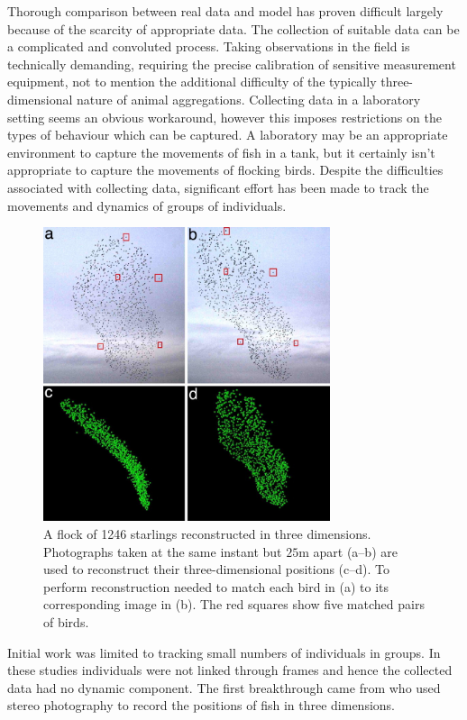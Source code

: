 Thorough comparison between real data and model has proven difficult largely
because of the scarcity of appropriate data. The collection of suitable data
can be a complicated and convoluted process. Taking observations in the field
is technically demanding, requiring the precise calibration of sensitive
measurement equipment, not to mention the additional difficulty of the
typically three-dimensional nature of animal aggregations. Collecting data in a
laboratory setting seems an obvious workaround, however this imposes
restrictions on the types of behaviour which can be captured. A laboratory may
be an appropriate environment to capture the movements of fish in a tank, but
it certainly isn't appropriate to capture the movements of flocking birds.
Despite the difficulties associated with collecting data, significant effort
has been made to track the movements and dynamics of groups of individuals.

\begin{figure}[tb]
	\includegraphics[width=0.75\textwidth]{ballerini_starlings.jpg}
    \caption{A flock of 1246 starlings reconstructed in three dimensions.
      Photographs taken at the same instant but $25$m apart (a--b) are used
      to reconstruct their three-dimensional positions (c--d). To perform
      reconstruction \textcite{ballerini08} needed to match each bird in (a)
      to its corresponding image in (b). The red squares show five matched
      pairs of birds.}
	\label{fig:ballerini}
\end{figure}

Initial work was limited to tracking small numbers of individuals in groups. In
these studies individuals were not linked through frames and hence the
collected data had no dynamic component. The first breakthrough came from
\textcite{cullen65} who used stereo photography to record the positions of fish
in three dimensions.

